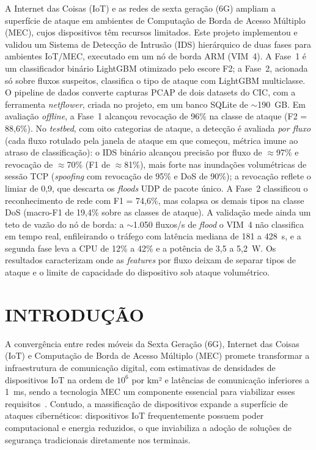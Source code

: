 \documentclass[12pt,a4paper]{article}
\begin{document}
A Internet das Coisas (IoT) e as redes de sexta geração (6G) ampliam a
superfície de ataque em ambientes de Computação de Borda de Acesso Múltiplo
(MEC), cujos dispositivos têm recursos limitados. Este projeto implementou e
validou um Sistema de Detecção de Intrusão (IDS) hierárquico de
duas fases para ambientes IoT/MEC, executado em um nó de borda ARM (VIM~4). A
Fase~1 é um classificador binário LightGBM otimizado pelo escore F2; a Fase~2,
acionada só sobre fluxos suspeitos, classifica o tipo de ataque com LightGBM
multiclasse. O pipeline de dados converte capturas PCAP de dois datasets do
CIC, com a ferramenta \textit{netflower}, criada no projeto, em um banco SQLite
de $\sim$190~GB. Em avaliação \textit{offline}, a Fase~1 alcançou revocação
de 96\% na classe de ataque (F2 = 88,6\%). No \textit{testbed}, com oito
categorias de ataque, a detecção é avaliada \emph{por fluxo} (cada fluxo
rotulado pela janela de ataque em que começou, métrica imune ao atraso de
classificação): o IDS binário alcançou precisão por fluxo de $\approx$97\% e
revocação de $\approx$70\% (F1 de $\approx$81\%), mais forte nas inundações
volumétricas de sessão TCP (\textit{spoofing} com revocação de 95\% e DoS de
90\%); a revocação reflete o limiar de 0,9, que descarta os \textit{floods} UDP de
pacote único. A Fase~2 classificou o reconhecimento de rede com F1 = 74,6\%, mas
colapsa os demais tipos na classe DoS (macro-F1 de 19,4\% sobre as classes de
ataque). A validação mede ainda um teto de vazão do nó de borda: a $\sim$1.050
fluxos/s de \textit{flood} o VIM~4 não classifica em tempo real, enfileirando o
tráfego com latência mediana de 181 a 428~s, e a segunda fase leva a CPU de 12\% a
42\% e a potência de 3,5 a 5,2~W. Os resultados caracterizam onde as
\textit{features} por fluxo deixam de separar tipos de ataque e o limite de
capacidade do dispositivo sob ataque volumétrico.

\renewcommand{\contentsname}{SUMÁRIO}
\tableofcontents

\section{INTRODUÇÃO}
\label{sec:introducao}

A convergência entre redes móveis da Sexta Geração (6G), Internet das Coisas
(IoT) e Computação de Borda de Acesso Múltiplo (MEC) promete transformar a
infraestrutura de comunicação digital, com estimativas de densidades de
dispositivos IoT na ordem de $10^6$ por km² e latências de comunicação
inferiores a 1~ms, sendo a tecnologia MEC um componente essencial para
viabilizar esses requisitos~\cite{you:21}. Contudo, a massificação de
dispositivos expande a superfície de ataques cibernéticos: dispositivos IoT
frequentemente possuem poder computacional e energia reduzidos, o que
inviabiliza a adoção de soluções de segurança tradicionais diretamente nos
terminais.
\end{document}
